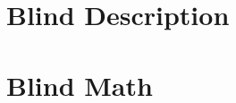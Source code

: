 
\chapter{Blind Description}

\Blinddescription


\chapter{Blind Math}

\blindmathpaper























